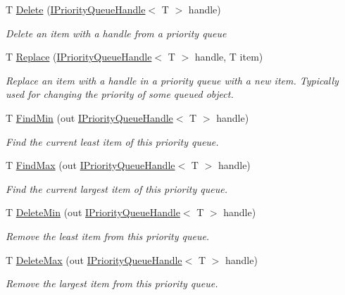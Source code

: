 \begin{DoxyCompactItemize}
T \hyperlink{interface_c5_1_1_i_priority_queue_a8b1272ae3287f72eeece44d17a9c2eff}{Delete} (\hyperlink{interface_c5_1_1_i_priority_queue_handle}{I\+Priority\+Queue\+Handle}$<$ T $>$ handle)
\begin{DoxyCompactList}\small\item\em Delete an item with a handle from a priority queue \end{DoxyCompactList}\item 
T \hyperlink{interface_c5_1_1_i_priority_queue_ae5784abdd5e7b6079c4cb88dd40c34ad}{Replace} (\hyperlink{interface_c5_1_1_i_priority_queue_handle}{I\+Priority\+Queue\+Handle}$<$ T $>$ handle, T item)
\begin{DoxyCompactList}\small\item\em Replace an item with a handle in a priority queue with a new item. Typically used for changing the priority of some queued object. \end{DoxyCompactList}\item 
T \hyperlink{interface_c5_1_1_i_priority_queue_af200c7e915e72ee4bf283b1bbf2eed4d}{Find\+Min} (out \hyperlink{interface_c5_1_1_i_priority_queue_handle}{I\+Priority\+Queue\+Handle}$<$ T $>$ handle)
\begin{DoxyCompactList}\small\item\em Find the current least item of this priority queue. \end{DoxyCompactList}\item 
T \hyperlink{interface_c5_1_1_i_priority_queue_afb1b1299785da3d22ac24332fafe907b}{Find\+Max} (out \hyperlink{interface_c5_1_1_i_priority_queue_handle}{I\+Priority\+Queue\+Handle}$<$ T $>$ handle)
\begin{DoxyCompactList}\small\item\em Find the current largest item of this priority queue. \end{DoxyCompactList}\item 
T \hyperlink{interface_c5_1_1_i_priority_queue_a3aca77813a8c6d30de8bc8d8ff734de0}{Delete\+Min} (out \hyperlink{interface_c5_1_1_i_priority_queue_handle}{I\+Priority\+Queue\+Handle}$<$ T $>$ handle)
\begin{DoxyCompactList}\small\item\em Remove the least item from this priority queue. \end{DoxyCompactList}\item 
T \hyperlink{interface_c5_1_1_i_priority_queue_ae6b746354d02c65d0435040682baf0c9}{Delete\+Max} (out \hyperlink{interface_c5_1_1_i_priority_queue_handle}{I\+Priority\+Queue\+Handle}$<$ T $>$ handle)
\begin{DoxyCompactList}\small\item\em Remove the largest item from this priority queue. \end{DoxyCompactList}\end{DoxyCompactItemize}

